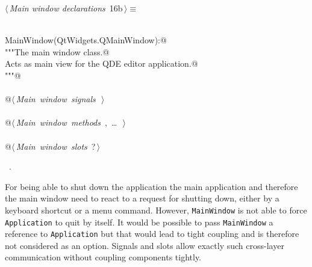 \documentclass[
    a4paper,      %
    10pt,         %
    openright,    %
    notitlepage,  %
    parskip=half, %
]{scrreprt}       %
\theoremstyle{definition}                    %
\begin{document}
\begin{flushleft} \small
\begin{minipage}{\linewidth}\label{scrap6}\raggedright\small
{} $\langle\,${\itshape Main window declarations}\nobreak\ {\footnotesize {16b}}$\,\rangle\equiv$
\vspace{-1ex}
\begin{list}{}{} \item
\mbox{}\lstinline@@\\
\mbox{}\lstinline@class MainWindow(QtWidgets.QMainWindow):@\\
\mbox{}\lstinline@    """The main window class.@\\
\mbox{}\lstinline@    Acts as main view for the QDE editor application.@\\
\mbox{}\lstinline@    """@\\
\mbox{}\lstinline@@\\
\mbox{}\lstinline@    @\hbox{$\langle\,${\itshape Main window signals}\nobreak\ {\footnotesize {}}$\,\rangle$}\lstinline@@\\
\mbox{}\lstinline@@\\
\mbox{}\lstinline@    @\hbox{$\langle\,${\itshape Main window methods}\nobreak\ {\footnotesize {}, \ldots\ }$\,\rangle$}\lstinline@@\\
\mbox{}\lstinline@@\\
\mbox{}\lstinline@    @\hbox{$\langle\,${\itshape Main window slots}\nobreak\ {\footnotesize ?}$\,\rangle$}\lstinline@@\\
\mbox{}\lstinline@@{\NWsep}
\end{list}
\vspace{-1.5ex}
\footnotesize
\begin{list}{}{\setlength{\itemsep}{-\parsep}\setlength{\itemindent}{-\leftmargin}}
\item \NWtxtMacroRefIn\ .

\item{}
\end{list}
\end{minipage}\vspace{4ex}
\end{flushleft}
For being able to shut down the application the main application and therefore
the main window need to react to a request for shutting down, either by a
keyboard shortcut or a menu command. However, \verb=MainWindow= is not able to
force \verb=Application= to quit by itself. It would be possible to pass
\verb=MainWindow= a reference to \verb=Application= but that would lead to tight
coupling and is therefore not considered as an option. Signals and slots allow
exactly such cross-layer communication without coupling components tightly.
\end{document}
